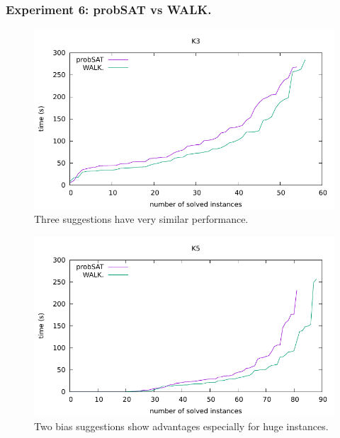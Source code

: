 \documentclass[12pt,a4paper,twoside]{scrartcl}
\numberwithin{equation}{section}
\begin{document}
\subsubsection{Experiment 6: probSAT vs WALK.} 
\label{sec:Experiment 6} 
  \begin{figure}[H]
\begin{center}
  \includegraphics[scale = 1]{DATA/K3/e4w.pdf}
  \end{center}
  \caption{Three suggestions have very similar performance.}
  \label{Experiment 6 k3 cactus plot}
  \end{figure}
  \begin{figure}[H]
\begin{center}
  \includegraphics[scale = 1]{DATA/K5/e4w.pdf}
  \end{center}
  \caption{Two bias suggestions show advantages especially for huge instances.}
  \label{Experiment 6 k5 cactus plot}
  \end{figure}
\end{document}

